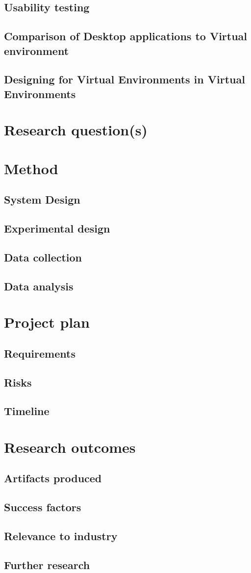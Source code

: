 \documentclass{sig-alternate-05-2015}
\begin{document}
\subsection{Usability testing}
\subsection{Comparison of Desktop applications to Virtual environment}
\subsection{Designing for Virtual Environments in Virtual Environments}
\section{Research question(s)}
\section{Method}
\subsection{System Design}
\subsection{Experimental design}
\subsection{Data collection}
\subsection{Data analysis}
\section{Project plan}
\subsection{Requirements}
\subsection{Risks}
\subsection{Timeline}
\section{Research outcomes}
\subsection{Artifacts produced}
\subsection{Success factors}
\subsection{Relevance to industry}
\subsection{Further research}



\end{document}
